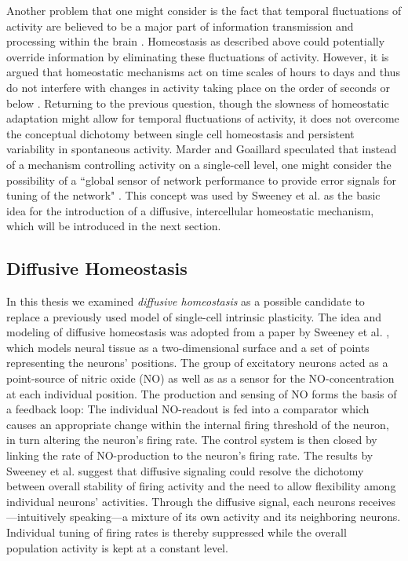 \documentclass[10pt,a4paper]{article}
\begin{document}
Another problem that one might consider is the fact that temporal fluctuations of activity are believed to be a major part of information transmission and processing within the brain \cite[p. 123--150]{Theor_Neur_Dayan}. Homeostasis as described above could potentially override information by eliminating these fluctuations of activity. However, it is argued that homeostatic mechanisms act on time scales of hours to days and thus do not interfere with changes in activity taking place on the order of seconds or below \cite{Turrigiano_2011}. Returning to the previous question, though the slowness of homeostatic adaptation might allow for temporal fluctuations of activity, it does not overcome the conceptual dichotomy between single cell homeostasis and persistent variability in spontaneous activity. Marder and Goaillard speculated that instead of a mechanism controlling activity on a single-cell level, one might consider the possibility of a ``global sensor of network performance to provide error signals for tuning of the network" \cite{Marder_2006}. This concept was used by Sweeney et al. as the basic idea for the introduction of a diffusive, intercellular homeostatic mechanism, which will be introduced in the next section.

\subsection{Diffusive Homeostasis}\label{DIff_Hom_Intro_Section}
In this thesis we examined \textit{diffusive homeostasis} as a possible candidate to replace a previously used model of single-cell intrinsic plasticity. The idea and modeling of diffusive homeostasis was adopted from a paper by Sweeney et al. \cite{Sweeney_Paper}, which models neural tissue as a two-dimensional surface and a set of points representing the neurons' positions. The group of excitatory neurons acted as a point-source of nitric oxide (NO) as well as as a sensor for the NO-concentration at each individual position. The production and sensing of NO forms the basis of a feedback loop: The individual NO-readout is fed into a comparator which causes an appropriate change within the internal firing threshold of the neuron, in turn altering the neuron's firing rate. The control system is then closed by linking the rate of NO-production to the neuron's firing rate. The results by Sweeney et al. suggest that diffusive signaling could resolve the dichotomy between overall stability of firing activity and the need to allow flexibility among individual neurons' activities. Through the diffusive signal, each neurons receives---intuitively speaking---a mixture of its own activity and its neighboring neurons. Individual tuning of firing rates is thereby suppressed while the overall population activity is kept at a constant level.
\end{document}
